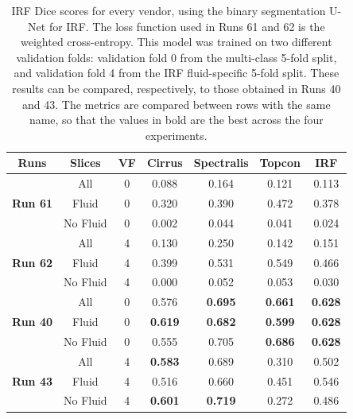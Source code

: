 \begin{table}[!ht]
	\caption{IRF Dice scores for every vendor, using the binary segmentation U-Net for IRF. The loss function used in Runs 61 and 62 is the weighted cross-entropy. This model was trained on two different validation folds: validation fold 0 from the multi-class 5-fold split, and validation fold 4 from the IRF fluid-specific 5-fold split. These results can be compared, respectively, to those obtained in Runs 40 and 43. The metrics are compared between rows with the same name, so that the values in bold are the best across the four experiments.}
	\centering
	\begin{tabular}{|c|c|c|c|c|c|c|}
			\hline
			\textbf{Runs} &
			\textbf{Slices} &  
			\textbf{VF} & 
			\textbf{Cirrus} & 
			\textbf{Spectralis} & 
			\textbf{Topcon} & 
			\textbf{IRF} \\ 
			
			\hline
			
			\multirow{3}{*}{\textbf{Run 61}} & All & 0 & 0.088 & 0.164 & 0.121 & 0.113 \\
			
			& Fluid & 0 & 0.320 & 0.390 & 0.472 & 0.378 \\
			
			& No Fluid & 0 & 0.002 & 0.044 & 0.041 & 0.024 \\
			
			\hline
			
			\multirow{3}{*}{\textbf{Run 62}} & All & 4 & 0.130 & 0.250 & 0.142 & 0.151 \\
			
			& Fluid & 4 & 0.399 & 0.531 & 0.549 & 0.466 \\
						
			& No Fluid & 4 & 0.000 & 0.052 & 0.053 & 0.030 \\
			
			\hline
			\hline
			
			\multirow{3}{*}{\textbf{Run 40}} & All & 0 & 0.576 & \textbf{0.695} & \textbf{0.661} & \textbf{0.628} \\
			
			& Fluid & 0 & \textbf{0.619} & \textbf{0.682} & \textbf{0.599} & \textbf{0.628} \\
			
			& No Fluid & 0 & 0.555 & 0.705 & \textbf{0.686} & \textbf{0.628} \\
			
			\hline
			
			\multirow{3}{*}{\textbf{Run 43}} & All & 4 & \textbf{0.583} & 0.689 & 0.310 & 0.502 \\
			
			& Fluid & 4 & 0.516 & 0.660 & 0.451 & 0.546 \\
			
			& No Fluid & 4 & \textbf{0.601} & \textbf{0.719} & 0.272 & 0.486 \\
			
			\hline
			
	\end{tabular}
	\label{tab:Experiment2.2Results}
\end{table}

